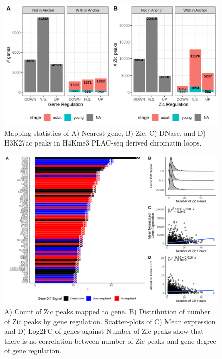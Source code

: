 \documentclass[fleqn,10pt,twocolumn]{wlscirep}
\begin{document}
\begin{figure}[ht]
\centering
\includegraphics[width=.90\linewidth]{../figures/supp_figure2.png}
\caption{Mapping statistics of A) Nearest gene, B) Zic, C) DNase, and D) H3K27ac peaks in H4Kme3 PLAC-seq derived chromatin loops.}
\label{fig:MappingStats}
\end{figure}


\begin{figure}[ht]
\centering
\includegraphics[width=.90\linewidth]{../figures/supp_figure3.png}
\caption{ A) Count of Zic peaks mapped to gene. B) Distribution of number of Zic peaks by gene regulation.  Scatter-plots of C) Mean expression and D) Log2FC of genes against Number of Zic peaks show that there is no correlation between number of Zic peaks and gene degree of gene regulation. }
\label{fig:nPeakstoGenes}
\end{figure}
\end{document}
